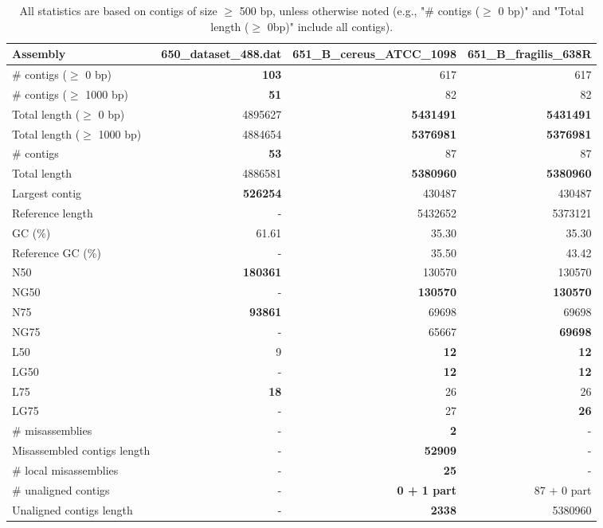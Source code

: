 \documentclass[12pt,a4paper]{article}
\begin{document}
\begin{table}[ht]
\begin{center}
\caption{All statistics are based on contigs of size $\geq$ 500 bp, unless otherwise noted (e.g., "\# contigs ($\geq$ 0 bp)" and "Total length ($\geq$ 0bp)" include all contigs).}
\begin{tabular}{|l*{3}{|r}|}
\hline
Assembly & 650\_dataset\_488.dat & 651\_B\_cereus\_ATCC\_1098 & 651\_B\_fragilis\_638R \\ \hline
\# contigs ($\geq$ 0 bp) & {\bf 103} & 617 & 617 \\ \hline
\# contigs ($\geq$ 1000 bp) & {\bf 51} & 82 & 82 \\ \hline
Total length ($\geq$ 0 bp) & 4895627 & {\bf 5431491} & {\bf 5431491} \\ \hline
Total length ($\geq$ 1000 bp) & 4884654 & {\bf 5376981} & {\bf 5376981} \\ \hline
\# contigs & {\bf 53} & 87 & 87 \\ \hline
Total length & 4886581 & {\bf 5380960} & {\bf 5380960} \\ \hline
Largest contig & {\bf 526254} & 430487 & 430487 \\ \hline
Reference length & - & 5432652 & 5373121 \\ \hline
GC (\%) & 61.61 & 35.30 & 35.30 \\ \hline
Reference GC (\%) & - & 35.50 & 43.42 \\ \hline
N50 & {\bf 180361} & 130570 & 130570 \\ \hline
NG50 & - & {\bf 130570} & {\bf 130570} \\ \hline
N75 & {\bf 93861} & 69698 & 69698 \\ \hline
NG75 & - & 65667 & {\bf 69698} \\ \hline
L50 & 9 & {\bf 12} & {\bf 12} \\ \hline
LG50 & - & {\bf 12} & {\bf 12} \\ \hline
L75 & {\bf 18} & 26 & 26 \\ \hline
LG75 & - & 27 & {\bf 26} \\ \hline
\# misassemblies & - & {\bf 2} & - \\ \hline
Misassembled contigs length & - & {\bf 52909} & - \\ \hline
\# local misassemblies & - & {\bf 25} & - \\ \hline
\# unaligned contigs & - & {\bf 0 + 1 part} & 87 + 0 part \\ \hline
Unaligned contigs length & - & {\bf 2338} & 5380960 \\ \hline

\end{tabular}
\end{center}
\end{table}
\end{document}
